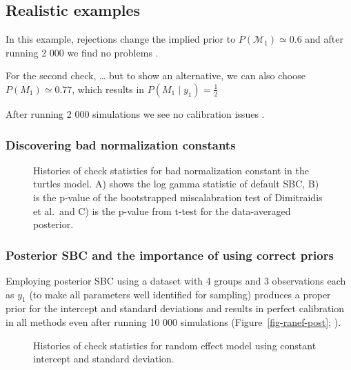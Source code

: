 \documentclass[
  letterpaper,
  DIV=11,
  numbers=noendperiod]{scrartcl}
\begin{document}
\subsection{Realistic examples}\label{realistic-examples}

In this example, rejections change the implied prior to
\(P(\mathcal{M}_1) \simeq 0.6\) and after running 2 000 we find no
problems .

For the second check, \ldots{} but to show an alternative, we can also
choose \(P(M_1) \simeq 0.77\), which results in
\(P(M_1\mid y_1) = \frac{1}{2}\)

After running 2 000 simulations we see no calibration issues .

\subsubsection{Discovering bad normalization
constants}\label{discovering-bad-normalization-constants}

\begin{figure}


\caption{\label{fig-turtles-bad-norm}Histories of check statistics for
bad normalization constant in the turtles model. A) shows the log gamma
statistic of default SBC, B) is the p-value of the bootstrapped
miscalabration test of Dimitraidis et al.~and C) is the p-value from
t-test for the data-averaged posterior.}

\end{figure}%

\subsubsection{Posterior SBC and the importance of using correct
priors}\label{posterior-sbc-and-the-importance-of-using-correct-priors}

Employing posterior SBC using a dataset with 4 groups and 3 observations
each as \(y_1\) (to make all parameters well identified for sampling)
produces a proper prior for the intercept and standard deviations and
results in perfect calibration in all methods even after running 10 000
simulations (Figure~\ref{fig-ranef-post}; ).

\begin{figure}


\caption{\label{fig-ranef-constant}Histories of check statistics for
random effect model using constant intercept and standard deviation.}

\end{figure}%
\end{document}

